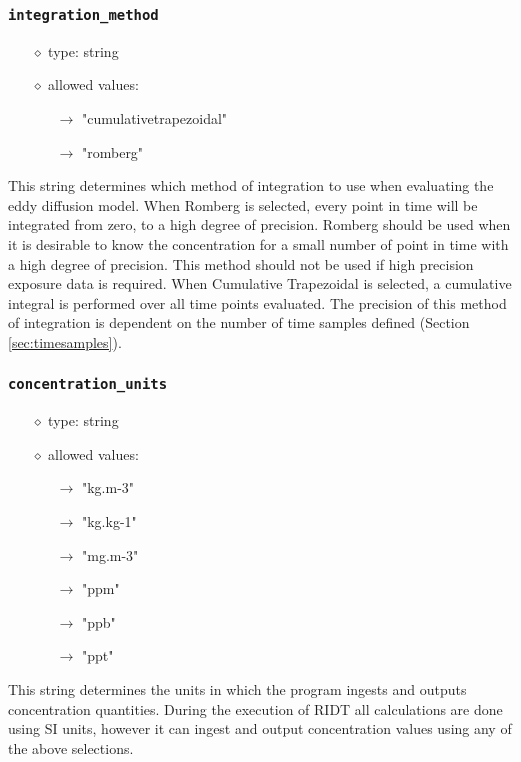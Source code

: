 \documentclass[]{article}
\def\code#1{\texttt{#1}}
\begin{document}
\subsubsection{\code{integration\_method}}\label{sec:integrationmethod}
\begin{itemize}
    \item[$\diamond$] type: string 
    \item[$\diamond$] allowed values:
    \begin{itemize}
        \item[$\rightarrow$] "cumulativetrapezoidal"
        \item[$\rightarrow$] "romberg"
    \end{itemize}
\end{itemize}
This string determines which method of integration to use when evaluating the
eddy diffusion model. When Romberg is selected, every point in time will be
integrated from zero, to a high degree of precision. Romberg should be used when
it is desirable to know the concentration for a small number of point in time
with a high degree of precision. This method should not be used if high
precision exposure data is required. When Cumulative Trapezoidal
is selected, a cumulative integral is performed over all time points evaluated.
The precision of this method of integration is dependent on the number of time
samples defined (Section \ref{sec:timesamples}).


\subsubsection{\code{concentration\_units}}\label{sec:concentrationunits}
\begin{itemize}
    \item[$\diamond$] type: string 
    \item[$\diamond$] allowed values:
    \begin{itemize}
        \item[$\rightarrow$] "kg.m-3"
        \item[$\rightarrow$] "kg.kg-1"
        \item[$\rightarrow$] "mg.m-3"
        \item[$\rightarrow$] "ppm"
        \item[$\rightarrow$] "ppb"
        \item[$\rightarrow$] "ppt"
    \end{itemize}
\end{itemize}
This string determines the units in which the program ingests and outputs
concentration quantities. During the execution of RIDT all calculations are done
using SI units, however it can ingest and output concentration values using any
of the above selections.\\
\end{document}
